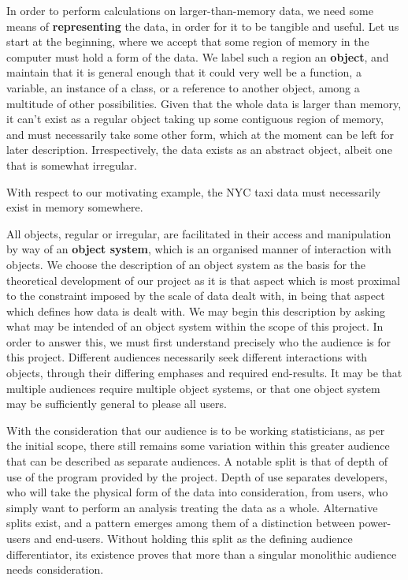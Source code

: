 In order to perform calculations on larger-than-memory data, we need some means of \textbf{representing} the data, in order for it to be tangible and useful.
Let us start at the beginning, where we accept that some region of memory in the computer must hold a form of the data.
We label such a region an \textbf{object}, and maintain that it is general enough that it could very well be a function, a variable, an instance of a class, or a reference to another object, among a multitude of other possibilities.
Given that the whole data is larger than memory, it can't exist as a regular object taking up some contiguous region of memory, and must necessarily take some other form, which at the moment can be left for later description.
Irrespectively, the data exists as an abstract object, albeit one that is somewhat irregular.

With respect to our motivating example, the NYC taxi data must necessarily exist in memory somewhere.

All objects, regular or irregular, are facilitated in their access and manipulation by way of an \textbf{object system}, which is an organised manner of interaction with objects.
We choose the description of an object system as the basis for the theoretical development of our project as it is that aspect which is most proximal to the constraint imposed by the scale of data dealt with, in being that aspect which defines how data is dealt with.
We may begin this description by asking what may be intended of an object system within the scope of this project.
In order to answer this, we must first understand precisely who the audience is for this project.
Different audiences necessarily seek different interactions with objects, through their differing emphases and required end-results.
It may be that multiple audiences require multiple object systems, or that one object system may be sufficiently general to please all users.

With the consideration that our audience is to be working statisticians, as per the initial scope, there still remains some variation within this greater audience that can be described as separate audiences.
A notable split is that of depth of use of the program provided by the project.
Depth of use separates developers, who will take the physical form of the data into consideration, from users, who simply want to perform an analysis treating the data as a whole.
Alternative splits exist, and a pattern emerges among them of a distinction between power-users and end-users.
Without holding this split as the defining audience differentiator, its existence proves that more than a singular monolithic audience needs consideration.

